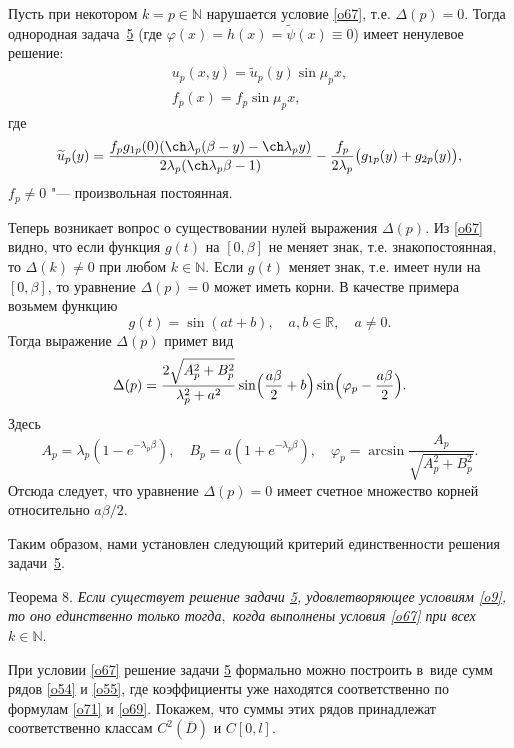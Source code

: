 Пусть при некотором $k=p\in\mathbb{N}$ нарушается условие \eqref{o67}, т.е. $\Delta(p)=0$. 
Тогда однородная задача~\hyperlink{sab:task5}{5} (где $\varphi(x)=h(x)=\widetilde{\psi}(x)\equiv0$) имеет ненулевое решение:
\begin{gather}\label{o72}
u_p(x,y)=\widetilde{u}_p(y)\sin\mu_px,
\\
\label{o74}
f_p(x)=f_p\sin\mu_px,
\end{gather}
где
\begin{equation}
\label{o74}
\widetilde{u}_p(y)=\frac{f_pg_{1p}(0)(\ch\lambda_p(\beta-y)-\ch\lambda_py)}{2\lambda_p(\ch\lambda_p\beta-1)}- \frac{f_p}{2\lambda_p} \bigl(g_{1p}(y)+g_{2p}(y)\bigr),
\end{equation}
$f_p\neq0$ "--- произвольная постоянная.


Теперь возникает вопрос о существовании нулей выражения $\Delta(p)$. Из \eqref{o67} видно, что если функция $g(t)$ на $[0,\beta]$ не меняет знак, т.е. знакопостоянная, то ${\Delta(k)\neq0}$ при любом $k\in\mathbb{N}$. Если $g(t)$ меняет знак, т.е. имеет нули на $[0,\beta]$, то уравнение $\Delta(p)=0$ может иметь корни. В качестве примера возьмем функцию
$$
g(t)=\sin(at+b),\quad  a, b\in\mathbb{R},\quad  a\neq0.
$$
Тогда выражение $\Delta(p)$ примет вид
$$
\Delta(p)=\frac{2\sqrt{A_p^2+B_p^2}}{\lambda_p^2+a^2}\sin \Bigl(\frac{a\beta}{2}+b\Bigr) \sin\Bigl(\varphi_p-\frac{a\beta}{2}\Bigr).
$$
Здесь
$$
A_p=\lambda_p(1-e^{-\lambda_p\beta}),\quad 
B_p=a(1+e^{-\lambda_p\beta}),\quad  
\varphi_p=\arcsin\frac{A_p}{\sqrt{A_p^2+B_p^2}}.
$$
Отсюда следует, что уравнение $\Delta(p)=0$ имеет счетное множество корней относительно $a\beta\big/2$.


Таким образом, нами установлен следующий критерий единственности решения задачи~\hyperlink{sab:task5}{5}.

\smallskip
\hypertarget{sab:th8}{}



{\small\sc Теорема 8.} \textit{Если существует решение задачи {\em \hyperlink{sab:task5}{5},} удовлетворяющее условиям {\em \eqref{o9},} то оно единственно только тогда$,$ когда выполнены условия {\em \eqref{o67}} при всех $k\in\mathbb{N}.$}

\smallskip

При условии \eqref{o67} решение задачи \hyperlink{sab:task5}{5} формально можно построить в~виде сумм рядов \eqref{o54} и \eqref{o55}, где  коэффициенты уже находятся соответственно по формулам \eqref{o71} и \eqref{o69}. 
Покажем, что суммы этих рядов принадлежат соответственно классам $C^2(\overline{D})$ и $C[0,l]$.

